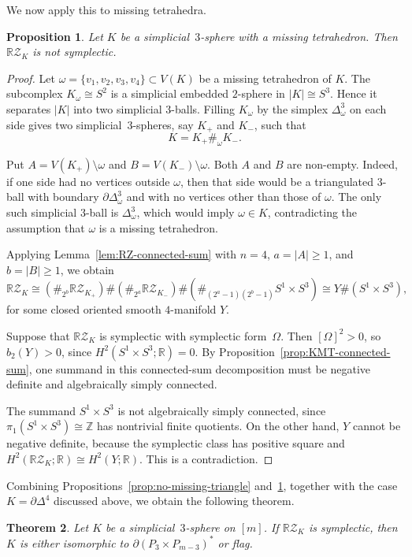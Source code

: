 \documentclass{amsart}
\newtheorem{theorem}{Theorem}[section]
\newtheorem{proposition}[theorem]{Proposition}
\numberwithin{equation}{section}
\theoremstyle{definition}
\theoremstyle{remark}
\newcommand{\Z}{\mathbb Z}
\newcommand{\R}{\mathbb R}
\newcommand{\RZ}{\mathbb R\mathcal Z}
\begin{document}
We now apply this to missing tetrahedra.

\begin{proposition}\label{prop:no-missing-tetrahedron}
    Let $K$ be a simplicial~$3$-sphere with a missing tetrahedron.
    Then $\RZ_K$ is not symplectic.
\end{proposition}
\begin{proof}
    Let $\omega=\{v_1,v_2,v_3,v_4\}\subset V(K)$ be a missing tetrahedron of $K$.
    The subcomplex $K_\omega\cong S^2$ is a simplicial embedded $2$-sphere in $|K|\cong S^3$.  
    Hence it separates $|K|$ into two simplicial $3$-balls.
    Filling $K_\omega$ by the simplex $\Delta_\omega^3$ on each side gives two simplicial~$3$-spheres, say $K_+$ and $K_-$, such that
    $$
        K=K_+\#_\omega K_-.
    $$
    
    Put $A=V(K_+)\setminus \omega$ and $B=V(K_-)\setminus \omega$.
    Both $A$ and $B$ are non-empty.  
    Indeed, if one side had no vertices outside $\omega$, then that side would be a triangulated $3$-ball with boundary $\partial\Delta_\omega^3$ and with no vertices other than those of $\omega$.  
    The only such simplicial $3$-ball is $\Delta_\omega^3$, which would imply $\omega\in K$, contradicting the assumption that $\omega$ is a missing tetrahedron.
    
    Applying Lemma~\ref{lem:RZ-connected-sum} with $n=4$, $a=|A|\geq 1$, and $b=|B|\geq 1$, we obtain 
    $$
        \RZ_K\cong\left(\#_{2^b}\RZ_{K_+}\right) \# \left(\#_{2^a}\RZ_{K_-}\right) \# \left(\#_{(2^a-1)(2^b-1)} S^1\times S^3\right) \cong Y\#(S^1\times S^3),
    $$
    for some closed oriented smooth $4$-manifold $Y$.
    
    Suppose that $\RZ_K$ is symplectic with symplectic form~$\Omega$.
    Then $[\Omega]^2>0$, so $b_2(Y)>0$, since $H^2(S^1\times S^3;\R)=0$.
    By Proposition~\ref{prop:KMT-connected-sum}, one summand in this connected-sum decomposition must be negative definite and algebraically simply connected.
    
    The summand $S^1\times S^3$ is not algebraically simply connected, since $\pi_1(S^1\times S^3)\cong\Z$ has nontrivial finite quotients.
    On the other hand, $Y$ cannot be negative definite, because the symplectic class has positive square and $H^2(\RZ_K;\R)\cong H^2(Y;\R)$.
    This is a contradiction.
\end{proof}

Combining Propositions~\ref{prop:no-missing-triangle} and~\ref{prop:no-missing-tetrahedron}, together with the case $K=\partial\Delta^4$ discussed above, we obtain the following theorem.
\begin{theorem}\label{thm:only_flag_support_symplectic_RZ}
    Let $K$ be a simplicial~$3$-sphere on $[m]$.
    If $\RZ_K$ is symplectic, then $K$ is either isomorphic to $\partial (P_3 \times P_{m-3})^\ast$ or flag.
\end{theorem}
\end{document}
